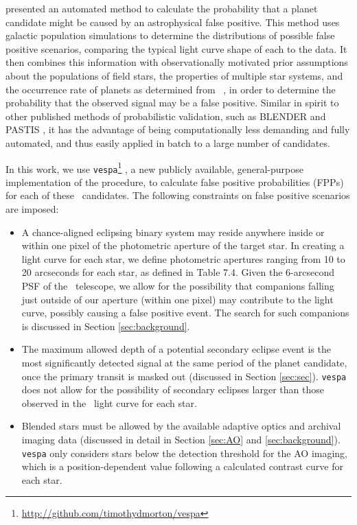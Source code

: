 \citet{Morton12} presented an automated method to calculate the
probability that a planet candidate might be caused by an
astrophysical false positive.
This method uses galactic population simulations to determine the
distributions of possible false positive scenarios, comparing the
typical light curve shape of each to the data.
It then combines this information with observationally motivated prior
assumptions about the populations of field stars, the properties of
multiple star systems, and the occurrence rate of planets as determined
from \kep\ \citep{Fressin13}, in order to determine the probability that
the observed signal may be a false positive.
Similar in spirit to other published methods of
probabilistic validation, such as BLENDER \citep{Torres11a} and PASTIS
\citep{Diaz14a}, it has the advantage of being computationally less demanding
and fully automated, and thus easily applied in batch to a large
number of candidates.

In this work, we use
\texttt{vespa}\footnote{\url{http://github.com/timothydmorton/vespa}} \citep{Morton15b},
a new publicly available, general-purpose implementation
of the \citet{Morton12} procedure,
to calculate false positive probabilities (FPPs) for each of these
\KT\ candidates.
The following constraints on false positive
scenarios are imposed:
\begin{itemize}
\item A chance-aligned eclipsing binary system may reside anywhere inside
or within one pixel of the photometric aperture of the target star.
In creating a light curve for each star, we define photometric apertures ranging
from 10 to 20 arcseconds for each star, as defined in Table 7.4.
Given the 6-arcsecond PSF of the \kep\ telescope, we allow for the possibility
that companions falling just outside of our aperture (within one pixel) may
contribute to the light curve, possibly causing a false positive event.
The search for such companions is discussed in
Section \ref{sec:background}.
\item The maximum allowed depth of a potential secondary eclipse event
is the most significantly detected signal at the same
period of the planet candidate, once the primary transit is masked out
(discussed in Section \ref{sec:sec}).
\texttt{vespa} does not allow for the possibility of secondary eclipses
larger than those observed in the \KT\ light curve for each star.
\item Blended stars must be allowed by the available adaptive optics
and archival imaging data (discussed in detail in Section 
\ref{sec:AO} and \ref{sec:background}).
\texttt{vespa} only considers stars below the detection threshold for
the AO imaging, which is a position-dependent value following a calculated
contrast curve for each star.
\end{itemize}

